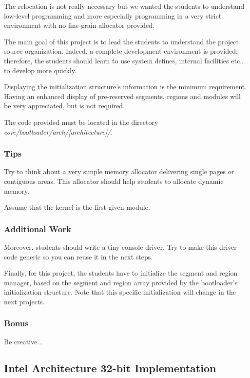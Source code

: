 The relocation is not really necessary but we wanted the students
to understand low-level programming and more especially programming
in a very strict environment with no fine-grain allocator provided.

The main goal of this project is to lead the students to understand the
project source organization. Indeed, a complete development environment
is provided; therefore, the students should learn to use system defines,
internal facilities etc.. to develop more quickly.

Displaying the initialization structure's information is the
minimum requirement. Having an enhanced display of pre-reserved
segments, regions and modules will be very appreciated, but is not required.

The code provided must be located in the directory
\textit{core/bootloader/arch/[architecture]/}.

\subsubsection{Tips}

Try to think about a very simple memory allocator delivering single
pages or contiguous areas. This allocator should help students to
allocate dynamic memory.

Assume that the kernel is the first given module.

\subsubsection{Additional Work}

Moreover, students should write a tiny console driver. Try to make this
driver code generic so you can reuse it in the next steps.

Finally, for this project, the students have to initialize the segment
and region manager, based on the segment and region array provided by
the bootloader's initialization structure. Note that this specific
initialization will change in the next projects.

\subsubsection{Bonus}

Be creative...

%
%

\subsection{Intel Architecture 32-bit Implementation}

